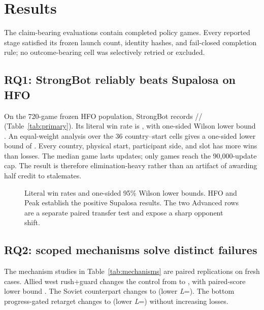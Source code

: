 \section{Results}
\label{sec:results}

The claim-bearing evaluations contain \OutcomeGameCount{} completed policy
games. Every reported stage satisfied its frozen launch count, identity hashes,
and fail-closed completion rule; no outcome-bearing cell was selectively
retried or excluded.

\begin{table}[t]
\centering
\caption{Primary literal-objective results. Lower bounds are one-sided 95\%
Wilson bounds on win rate. The Peak control and reciprocal policy use the same
180 fresh cases.}
\label{tab:primary}
\small

\end{table}

\subsection{RQ1: StrongBot reliably beats Supalosa on HFO}

On the 720-game frozen HFO population, StrongBot records
\HfoWins{}/\HfoDraws{}/\HfoLosses{} (Table~\ref{tab:primary}). Its literal win
rate is \HfoWinRate{}, with one-sided Wilson lower bound \HfoWilsonLower{}.
An equal-weight analysis over the 36 country--start cells gives a one-sided
lower bound of \HfoClusterLower{}. Every country, physical start, participant
side, and slot has more wins than losses. The median game lasts
\HfoMedianUpdates{} updates; only \HfoTickCapDraws{} games reach the
90,000-update cap. The result is therefore elimination-heavy rather than an
artifact of awarding half credit to stalemates.

\begin{figure}[t]
  \centering
  
  \caption{Literal win rates and one-sided 95\% Wilson lower bounds. HFO and
  Peak establish the positive Supalosa results. The two Advanced rows are a
  separate paired transfer test and expose a sharp opponent shift.}
  \label{fig:primary-bounds}
\end{figure}

\subsection{RQ2: scoped mechanisms solve distinct failures}

The mechanism studies in Table~\ref{tab:mechanisms} are paired replications on
fresh cases. Allied west rush+guard changes the control from
\AlliedControlWdl{} to \AlliedWinnerWdl{}, with paired-score lower bound
\AlliedPairedLower{}. The Soviet counterpart changes
\SovietControlWdl{} to \SovietWinnerWdl{} (lower
\textit{L}=\SovietPairedLower{}). The bottom progress-gated retarget changes
\BottomControlWdl{} to \BottomWinnerWdl{} (lower
\textit{L}=\BottomPairedLower{}) without increasing losses.

